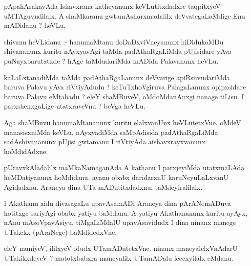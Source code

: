 \documentclass{article}
\begin{document}
\begin{mn}
pApahArakavAda  Ishavxrana  katheyanunx  keVLutitxdadxre  taqpitxyeV  uMTAguvudilalx.  A  shaMkaranu  gwtamAsharxmadalilx  
deVvategaLoMdige  Enu  mADidanu ?  heVLu.
\end{mn}

\begin{mn}
shivanu  heVLidanu :- hanumaMtanu  doDaDxviVneyanunx  hiDidukoMDu  shivananunx  kuritu  nAyxyavAgi  taMda  padAthaRgaLiMda  
pUjisidare  yAva  puNayxbarutatxde ?   hAge  taMdudariMda  mADida  Palavanunx  heVLu.
\end{mn}

\begin{mn}
kaLaLxtanadiMda  taMda  padAthaRgaLanunx  deVvarige  apiRsuvudariMda  baruva  Palavu  yAva  riVtiyAdudu ?  keTuTxhoVgiruva  PalagaLanunx  
opipxsidare  baruva  Palavu  eMtahadu ?  eleY  shaMBuveV,  oMdoMdanAnxgi  nanage  tiLisu.  I  parxshenxgaLige  utatxraveVnu ? beVga  heVLu.
\end{mn}

\begin{mn}
Aga  shaMBuvu  hanumaMtananunx  kuritu  elalxvanUnx  heVLutetxVne.  oMdeV  manasisxniMda  keVLu.  nAyxyadiMda  saMpAdisida  
padAthaRgaLiMda  sadAshivananunx  pUjisi  gwtamanu  I  riVtiyAda  aishavxrayxvanunx  hoMdidAdxne.
\end{mn}

\begin{mn}
pUravxkAladalilx  maMkaNamaganAda  A kathanu  I  parxjeyiMda  utatxmaLAda  heMDatiyanunx  hoMdidanu.  avanu  obabx  daridarxnU  
karuNeyuLaLxvanU  Agidadxnu.  Araneya  dina  UTa  mADutitxdadxnu.  taMdeyiralilalx.
\end{mn}

\begin{mn}
I  Akathanu  aidu  divasagaLu  upavAsamADi  Araneya  dina  pArANemADuva  hotitxge  sariyAgi  obabx  yatiyu  baMdanu.  A  yatiyu  Akathananunx  
kuritu  ayAyx,  nAnu  mAsoVpavAsiyu.  tiMgaLiMdalU  upavAsavidudx  I  dina  ninanx  manege  UTakekx (pAraNege) baMdidedxVne.
\end{mn}

\begin{mn}
eleY  muniyeV,  ililxyeV  idudx  UTamADutetxVne.  ninanx  maneyalelxVnAdarU  UTakikxdeyeV ?  matotxbabxra  maneyalilx  UTamADalu  icecxyilalx  eMdanu.
\end{mn}

\begin{mn}

\end{mn}
\end{document}
